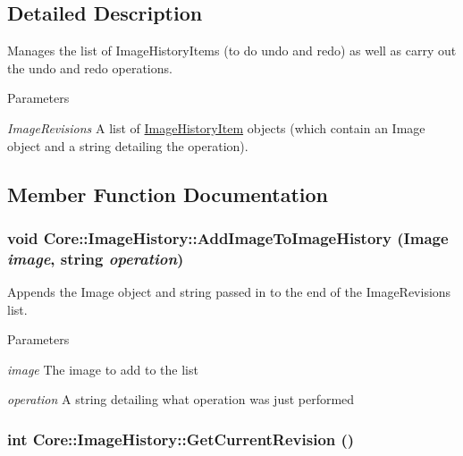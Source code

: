 \subsection{Detailed Description}
Manages the list of ImageHistoryItems (to do undo and redo) as well as carry out the undo and redo operations. 
\begin{DoxyParams}{Parameters}
\item[{\em ImageRevisions}]A list of \hyperlink{class_core_1_1_image_history_item}{ImageHistoryItem} objects (which contain an Image object and a string detailing the operation). \end{DoxyParams}


\subsection{Member Function Documentation}
\hypertarget{class_core_1_1_image_history_a6631d7fefea3a1a28fc6dcdf887daf37}{
\subsubsection[{AddImageToImageHistory}]{\setlength{\rightskip}{0pt plus 5cm}void Core::ImageHistory::AddImageToImageHistory (Image {\em image}, \/  string {\em operation})}}
\label{class_core_1_1_image_history_a6631d7fefea3a1a28fc6dcdf887daf37}
Appends the Image object and string passed in to the end of the ImageRevisions list. 
\begin{DoxyParams}{Parameters}
\item[{\em image}]The image to add to the list \item[{\em operation}]A string detailing what operation was just performed \end{DoxyParams}
\hypertarget{class_core_1_1_image_history_a421e672ff9f20e10a03bf989cff4442e}{
\subsubsection[{GetCurrentRevision}]{\setlength{\rightskip}{0pt plus 5cm}int Core::ImageHistory::GetCurrentRevision ()}}
